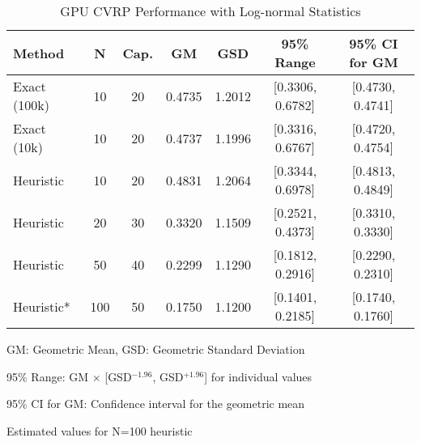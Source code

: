 \begin{table*}[htbp]
\centering
\caption{GPU CVRP Performance with Log-normal Statistics}
\label{tab:gpu-performance-complete}
\begin{tabular}{@{}l c c S[table-format=1.4] S[table-format=1.4] c c@{}}
\toprule
\textbf{Method} & \textbf{N} & \textbf{Cap.} & {\textbf{GM}} & {\textbf{GSD}} & \textbf{95\% Range} & \textbf{95\% CI for GM} \\
\midrule
Exact (100k) & 10 & 20 & 0.4735 & 1.2012 & [0.3306, 0.6782] & [0.4730, 0.4741] \\
Exact (10k) & 10 & 20 & 0.4737 & 1.1996 & [0.3316, 0.6767] & [0.4720, 0.4754] \\
Heuristic & 10 & 20 & 0.4831 & 1.2064 & [0.3344, 0.6978] & [0.4813, 0.4849] \\
Heuristic & 20 & 30 & 0.3320 & 1.1509 & [0.2521, 0.4373] & [0.3310, 0.3330] \\
Heuristic & 50 & 40 & 0.2299 & 1.1290 & [0.1812, 0.2916] & [0.2290, 0.2310] \\
Heuristic* & 100 & 50 & 0.1750 & 1.1200 & [0.1401, 0.2185] & [0.1740, 0.1760] \\
\bottomrule
\end{tabular}
\begin{tablenotes}
\small
\item GM: Geometric Mean, GSD: Geometric Standard Deviation
\item 95\% Range: GM $\times$ [GSD$^{-1.96}$, GSD$^{+1.96}$] for individual values
\item 95\% CI for GM: Confidence interval for the geometric mean
\item * Estimated values for N=100 heuristic
\end{tablenotes}
\end{table*}
